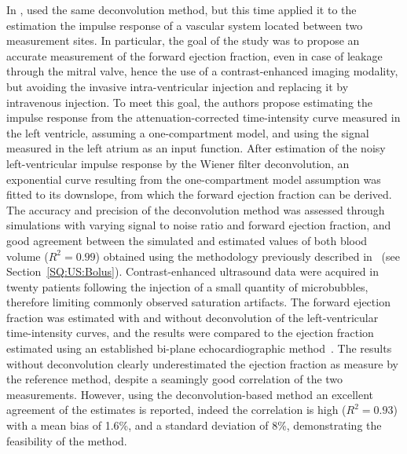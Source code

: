 In \citeyear{Mischi:2005df}, \citet{Mischi:2005df} used the same deconvolution method, but this time applied it to the estimation the impulse response of a vascular system located between two measurement sites.
In particular, the goal of the study was to propose an accurate measurement of the forward ejection fraction, even in case of leakage through the mitral valve, hence the use of a contrast-enhanced imaging modality, but avoiding the invasive intra-ventricular injection and replacing it by intravenous injection.
To meet this goal, the authors propose estimating the impulse response from the attenuation-corrected time-intensity curve measured in the left ventricle, assuming a one-compartment model, and using the signal measured in the left atrium as an input function.
After estimation of the noisy left-ventricular impulse response by the Wiener filter deconvolution, an exponential curve resulting from the one-compartment model assumption was fitted to its downslope, from which the forward ejection fraction can be derived.
The accuracy and precision of the deconvolution method was assessed through simulations with varying signal to noise ratio and forward ejection fraction, and good agreement between the simulated and estimated values of both blood volume ($R^2 = 0.99$) obtained using the methodology previously described in~\cite{Mischi:2004cn} (see Section~\ref{SQ:US:Bolus}).
Contrast-enhanced ultrasound data were acquired in twenty patients following the injection of a small quantity of microbubbles, therefore limiting commonly observed saturation artifacts.
The forward ejection fraction was estimated with and without deconvolution of the left-ventricular time-intensity curves, and the results were compared to the ejection fraction estimated using an established bi-plane echocardiographic method~\cite{BroganIII:1992dt}.
The results without deconvolution clearly underestimated the ejection fraction as measure by the reference method, despite a seamingly good correlation of the two measurements.
However, using the deconvolution-based method an excellent agreement of the estimates is reported, indeed the correlation is high ($R^2 = 0.93$) with a mean bias of 1.6\%, and a standard deviation of 8\%, demonstrating the feasibility of the method.

